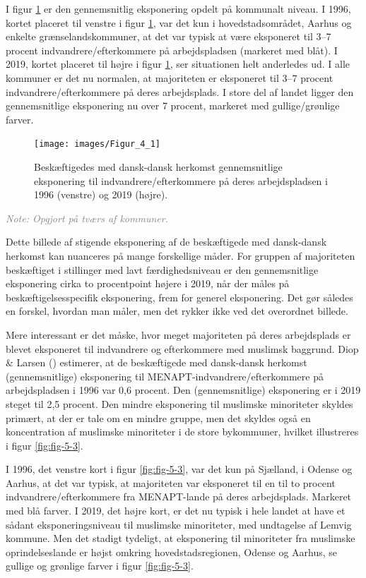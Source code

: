 \documentclass[
]{book}
\begin{document}
I figur \ref{fig:fig-5-2} er den gennemsnitlig eksponering opdelt på kommunalt niveau. I 1996, kortet placeret til venstre i figur \ref{fig:fig-5-2}, var det kun i hovedstadsområdet, Aarhus og enkelte grænselandskommuner, at det var typisk at være eksponeret til 3--7 procent indvandrere/efterkommere på arbejdspladsen (markeret med blåt). I 2019, kortet placeret til højre i figur \ref{fig:fig-5-2}, ser situationen helt anderledes ud. I alle kommuner er det nu normalen, at majoriteten er eksponeret til 3--7 procent indvandrere/efterkommere på deres arbejdsplads. I store del af landet ligger den gennemsnitlige eksponering nu over 7 procent, markeret med gullige/grønlige farver.

\newpage

\begin{figure}
\texttt{[image: images/Figur\_4\_1]} \caption{Beskæftigedes med dansk-dansk herkomst gennemsnitlige eksponering til indvandrere/efterkommere på deres arbejdspladsen i 1996 (venstre) og 2019 (højre).}\label{fig:fig-5-2}
\end{figure}

\begin{footnotesize}\textit{\textcolor{gray}{
Note: Opgjort på tværs af kommuner.
}}
\end{footnotesize}

Dette billede af stigende eksponering af de beskæftigede med dansk-dansk herkomst kan nuanceres på mange forskellige måder. For gruppen af majoriteten beskæftiget i stillinger med lavt færdighedsniveau er den gennemsnitlige eksponering cirka to procentpoint højere i 2019, når der måles på beskæftigelsesspecifik eksponering, frem for generel eksponering. Det gør således en forskel, hvordan man måler, men det rykker ikke ved det overordnet billede.

Mere interessant er det måske, hvor meget majoriteten på deres arbejdsplads er blevet eksponeret til indvandrere og efterkommere med muslimsk baggrund. Diop \& Larsen () estimerer, at de beskæftigede med dansk-dansk herkomst (gennemsnitlige) eksponering til MENAPT-indvandrere/efterkommere på arbejdspladsen i 1996 var 0,6 procent. Den (gennemsnitlige) eksponering er i 2019 steget til 2,5 procent. Den mindre eksponering til muslimske minoriteter skyldes primært, at der er tale om en mindre gruppe, men det skyldes også en koncentration af muslimske minoriteter i de store bykommuner, hvilket illustreres i figur \ref{fig:fig-5-3}.

I 1996, det venstre kort i figur \ref{fig:fig-5-3}, var det kun på Sjælland, i Odense og Aarhus, at det var typisk, at majoriteten var eksponeret til en til to procent indvandrere/efterkommere fra MENAPT-lande på deres arbejdsplads. Markeret med blå farver. I 2019, det højre kort, er det nu typisk i hele landet at have et sådant eksponeringsniveau til muslimske minoriteter, med undtagelse af Lemvig kommune. Men det stadigt tydeligt, at eksponering til minoriteter fra muslimske oprindelseslande er højst omkring hovedstadsregionen, Odense og Aarhus, se gullige og grønlige farver i figur \ref{fig:fig-5-3}.
\end{document}
